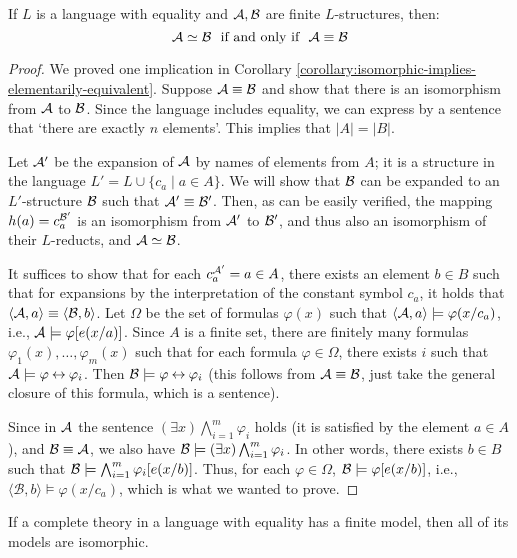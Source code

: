 \begin{proposition}
    If $L$ is a language with equality and $\mathcal{A}, \mathcal{B}$ are finite $L$-structures, then:
    $$
    \mathcal{A} \simeq \mathcal{B}\ \text{ if and only if }\ \mathcal{A} \equiv \mathcal{B}
    $$
\end{proposition}
\begin{proof}
    We proved one implication in Corollary \ref{corollary:isomorphic-implies-elementarily-equivalent}. Suppose $\mathcal{A} \equiv \mathcal{B}$ and show that there is an isomorphism from $\mathcal{A}$ to $\mathcal{B}$. Since the language includes equality, we can express by a sentence that `there are exactly $n$ elements'. This implies that $|A| = |B|$.

    Let $\mathcal{A}'$ be the expansion of $\mathcal{A}$ by names of elements from $A$; it is a structure in the language $L' = L \cup \{c_a \mid a \in A\}$. We will show that $\mathcal{B}$ can be expanded to an $L'$-structure $\mathcal{B}$ such that $\mathcal{A}' \equiv \mathcal{B}'$. Then, as can be easily verified, the mapping $h(a) = c_a^{\mathcal{B}'}$ is an isomorphism from $\mathcal{A}'$ to $\mathcal{B}'$, and thus also an isomorphism of their $L$-reducts, and $\mathcal{A} \simeq \mathcal{B}$.

    It suffices to show that for each $c_a^{\mathcal{A}'} = a \in A$, there exists an element $b \in B$ such that for expansions by the interpretation of the constant symbol $c_a$, it holds that $\langle \mathcal{A}, a \rangle \equiv \langle \mathcal{B}, b \rangle$. Let $\Omega$ be the set of formulas $\varphi(x)$ such that $\langle \mathcal{A}, a \rangle \models \varphi(x/c_a)$, i.e., $\mathcal{A} \models \varphi[e(x/a)]$. Since $A$ is a finite set, there are finitely many formulas $\varphi_1(x), \dots, \varphi_m(x)$ such that for each formula $\varphi \in \Omega$, there exists $i$ such that $\mathcal{A} \models \varphi \mathbin{\leftrightarrow} \varphi_i$. Then $\mathcal{B} \models \varphi \mathbin{\leftrightarrow} \varphi_i$ (this follows from $\mathcal{A} \equiv \mathcal{B}$, just take the general closure of this formula, which is a sentence).
    
    Since in $\mathcal{A}$ the sentence $(\exists x)\bigwedge_{i=1}^m \varphi_i$ holds (it is satisfied by the element $a \in A$), and $\mathcal{B} \equiv \mathcal{A}$, we also have $\mathcal{B} \models (\exists x)\bigwedge_{i=1}^m \varphi_i$. In other words, there exists $b \in B$ such that $\mathcal{B} \models \bigwedge_{i=1}^m \varphi_i[e(x/b)]$. Thus, for each $\varphi \in \Omega$, $\mathcal{B} \models \varphi[e(x/b)]$, i.e., $\langle \mathcal{B}, b \rangle \models \varphi(x/c_a)$, which is what we wanted to prove.
\end{proof}

\begin{corollary}
    If a complete theory in a language with equality has a finite model, then all of its models are isomorphic.
\end{corollary}

